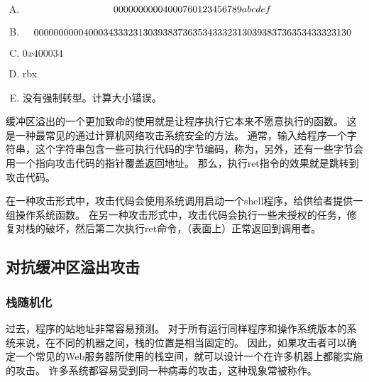 {{        %
        \begin{practicec}
            \begin{enumerate}[A.]
                \item
                {
                    \[
                        00 00 00 00 00 40 00 76 \\
                        01 23 45 67 89 ab cd ef
                    \]
                }
                \item
                {
                    \[
                        00 00 00 00 00 40 00 34 \\
                        33 32 31 30 39 38 37 36 \\
                        35 34 33 32 31 30 39 38 \\
                        37 36 35 34 33 32 31 30
                    \]
                }
                \item $0x40 00 34$
                \item rbx
                \item 没有强制转型。计算大小错误。
            \end{enumerate}
        \end{practicec}

        缓冲区溢出的一个更加致命的使用就是让程序执行它本来不愿意执行的函数。
        这是一种最常见的通过计算机网络攻击系统安全的方法。
        通常，输入给程序一个字符串，这个字符串包含一些可执行代码的字节编码，称为，另外，还有一些字节会用一个指向攻击代码的指针覆盖返回地址。
        那么，执行ret指令的效果就是跳转到攻击代码。

        在一种攻击形式中，攻击代码会使用系统调用启动一个shell程序，给供给者提供一组操作系统函数。
        在另一种攻击形式中，攻击代码会执行一些未授权的任务，修复对栈的破坏，然后第二次执行ret命令，（表面上）正常返回到调用者。
    }

    \subsection{对抗缓冲区溢出攻击}
    {
        \subsubsection{栈随机化}
        {
            过去，程序的站地址非常容易预测。
            对于所有运行同样程序和操作系统版本的系统来说，在不同的机器之间，栈的位置是相当固定的。
            因此，如果攻击者可以确定一个常见的Web服务器所使用的栈空间，就可以设计一个在许多机器上都能实施的攻击。
            许多系统都容易受到同一种病毒的攻击，这种现象常被称作。

}}}
